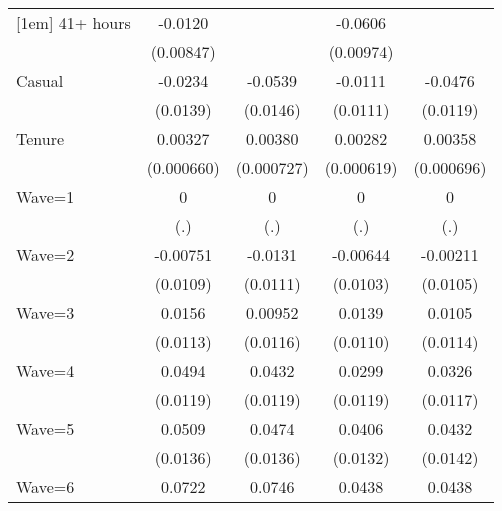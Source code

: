 {\begin{tabular}{l*{4}{c}}
[1em]
41+ hours           &     -0.0120         &                     &     -0.0606\sym{***}&                     \\
                    &   (0.00847)         &                     &   (0.00974)         &                     \\
[1em]
Casual              &     -0.0234         &     -0.0539\sym{***}&     -0.0111         &     -0.0476\sym{***}\\
                    &    (0.0139)         &    (0.0146)         &    (0.0111)         &    (0.0119)         \\
[1em]
Tenure              &     0.00327\sym{***}&     0.00380\sym{***}&     0.00282\sym{***}&     0.00358\sym{***}\\
                    &  (0.000660)         &  (0.000727)         &  (0.000619)         &  (0.000696)         \\
[1em]
Wave=1              &           0         &           0         &           0         &           0         \\
                    &         (.)         &         (.)         &         (.)         &         (.)         \\
[1em]
Wave=2              &    -0.00751         &     -0.0131         &    -0.00644         &    -0.00211         \\
                    &    (0.0109)         &    (0.0111)         &    (0.0103)         &    (0.0105)         \\
[1em]
Wave=3              &      0.0156         &     0.00952         &      0.0139         &      0.0105         \\
                    &    (0.0113)         &    (0.0116)         &    (0.0110)         &    (0.0114)         \\
[1em]
Wave=4              &      0.0494\sym{***}&      0.0432\sym{***}&      0.0299\sym{*}  &      0.0326\sym{**} \\
                    &    (0.0119)         &    (0.0119)         &    (0.0119)         &    (0.0117)         \\
[1em]
Wave=5              &      0.0509\sym{***}&      0.0474\sym{***}&      0.0406\sym{**} &      0.0432\sym{**} \\
                    &    (0.0136)         &    (0.0136)         &    (0.0132)         &    (0.0142)         \\
[1em]
Wave=6              &      0.0722\sym{***}&      0.0746\sym{***}&      0.0438\sym{**} &      0.0438\sym{**} \\

\end{tabular}}
